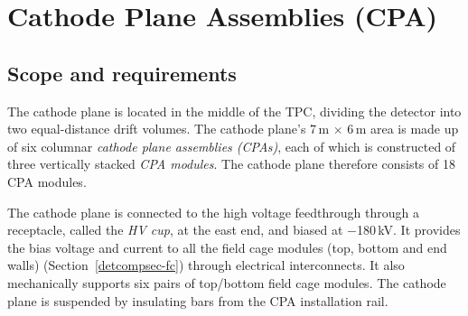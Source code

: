 


\section{Cathode Plane Assemblies (CPA)}
\label{sec:cpa}

\subsection{Scope and requirements}


The cathode plane is located in the middle of the TPC, dividing the detector into two equal-distance drift volumes. The cathode plane's 7\,m $\times$ 6\,m area is made up of six columnar \textit{cathode plane assemblies (CPAs)}, each of which is constructed of three vertically stacked \textit{CPA modules}. The cathode plane therefore consists of 18 CPA modules. 

The cathode plane is connected to the high voltage feedthrough through a receptacle, called the \textit{HV cup}, at the east end,  and biased at $-$180\,kV.   It provides the bias voltage and current to all the field cage modules (top, bottom and end walls) (Section~\ref{detcompsec-fc}) through electrical interconnects.  It also mechanically supports six pairs of top/bottom field cage modules. The cathode plane is suspended by insulating bars from the CPA installation rail.


